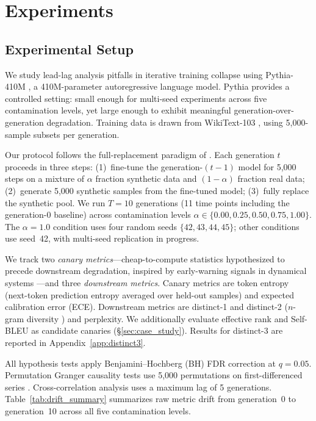 \section{Experiments}
\label{sec:experiments}

\subsection{Experimental Setup}
\label{sec:setup}

We study lead-lag analysis pitfalls in iterative training collapse using Pythia-410M \cite{biderman2023pythia}, a 410M-parameter autoregressive language model.
Pythia provides a controlled setting: small enough for multi-seed experiments across five contamination levels, yet large enough to exhibit meaningful generation-over-generation degradation.
Training data is drawn from WikiText-103 \cite{merity2017pointer}, using 5{,}000-sample subsets per generation.

Our protocol follows the full-replacement paradigm of \citet{shumailov2024curse}.
Each generation $t$ proceeds in three steps: (1)~fine-tune the generation-$(t{-}1)$ model for 5{,}000 steps on a mixture of $\alpha$ fraction synthetic data and $(1{-}\alpha)$ fraction real data; (2)~generate 5{,}000 synthetic samples from the fine-tuned model; (3)~fully replace the synthetic pool.
We run $T{=}10$ generations (11 time points including the generation-0 baseline) across contamination levels $\alpha \in \{0.00, 0.25, 0.50, 0.75, 1.00\}$.
The $\alpha{=}1.0$ condition uses four random seeds $\{42, 43, 44, 45\}$; other conditions use seed~42, with multi-seed replication in progress.

We track two \emph{canary metrics}---cheap-to-compute statistics hypothesized to precede downstream degradation, inspired by early-warning signals in dynamical systems \cite{scheffer2009early}---and three \emph{downstream metrics}.
Canary metrics are token entropy (next-token prediction entropy averaged over held-out samples) and expected calibration error (ECE).
Downstream metrics are distinct-1 and distinct-2 ($n$-gram diversity \cite{li2016diversity}) and perplexity.
We additionally evaluate effective rank and Self-BLEU as candidate canaries (\S\ref{sec:case_study}).
Results for distinct-3 are reported in Appendix~\ref{app:distinct3}.

All hypothesis tests apply Benjamini--Hochberg (BH) FDR correction at $q{=}0.05$.
Permutation Granger causality tests use 5{,}000 permutations on first-differenced series \cite{shojaie2022granger}.
Cross-correlation analysis uses a maximum lag of 5 generations.
Table~\ref{tab:drift_summary} summarizes raw metric drift from generation~0 to generation~10 across all five contamination levels.

